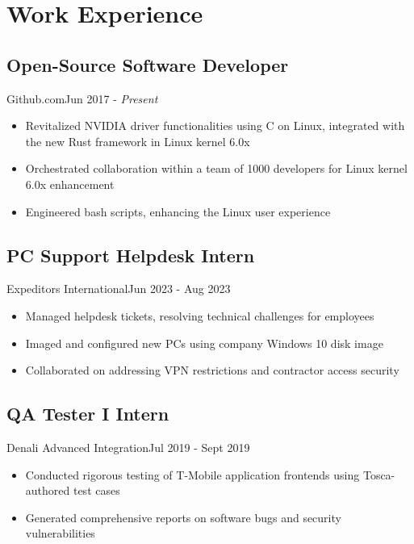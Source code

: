 \section{Work Experience}
\subsection{Open-Source Software Developer}{Github.com}{Jun 2017 - \textit{Present}}
\begin{itemize}
    \item Revitalized NVIDIA driver functionalities using C on Linux, integrated with the new Rust framework in Linux kernel 6.0x
    \item Orchestrated collaboration within a team of 1000 developers for Linux kernel 6.0x enhancement
    \item Engineered bash scripts, enhancing the Linux user experience
\end{itemize}
\subsection{PC Support Helpdesk Intern}{Expeditors International}{Jun 2023 - Aug 2023}
\begin{itemize}
    \item Managed helpdesk tickets, resolving technical challenges for employees
    \item Imaged and configured new PCs using company Windows 10 disk image
    \item Collaborated on addressing VPN restrictions and contractor access security
\end{itemize}
\subsection{QA Tester I Intern}{Denali Advanced Integration}{Jul 2019 - Sept 2019}
\begin{itemize}
    \item Conducted rigorous testing of T-Mobile application frontends using Tosca-authored test cases
    \item Generated comprehensive reports on software bugs and security vulnerabilities
\end{itemize}

